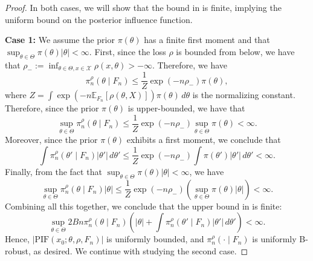 \documentclass[11pt, oneside]{amsart}
\theoremstyle{definition}   %
\newcommand{\E}{\mathbb{E}}
\newcommand{\loss}{\rho}
\newcommand{\mposterior}{\pi_n^{\loss}}
\begin{document}
\begin{proof}
    In both cases, we will show that the bound in  is finite, implying the uniform bound on the posterior influence function.
    
    \textbf{Case 1:} We assume the prior \( \pi(\theta) \) has a finite first moment and that \( \sup_{\theta \in \Theta} \pi(\theta) | \theta | < \infty \).
    First, since the loss \( \loss \) is bounded from below, we have that \( \loss_- := \inf_{\theta \in \Theta, x \in \mathcal{X}} \loss(x, \theta) > -\infty \). Therefore, we have
    \begin{equation*}
        \mposterior(\theta \mid F_n) \leq \frac{1}{Z} \exp(-n \loss_- ) \pi(\theta),
    \end{equation*}
    where \( Z = \int \exp \left ( - n \E_{F_n} [\loss (\theta, X)] \right ) \pi(\theta) \, d\theta \) is the normalizing constant. Therefore, since the prior \( \pi(\theta)\) is upper-bounded, we have that 
    \[ 
        \sup_{\theta \in \Theta} \mposterior(\theta \mid F_n) \leq \frac{1}{Z}\exp(-n \loss_- ) \sup_{\theta \in \Theta} \pi(\theta) < \infty. 
    \] 
    Moreover, since the prior \( \pi (\theta) \) exhibits a first moment, we conclude that
    \[
        \int \mposterior(\theta' \mid F_n) |\theta' | \, d\theta' \leq
        \frac{1}{Z} \exp(-n \loss_- ) \int \pi(\theta') |\theta' | \, d\theta'  < \infty.
    \]
    Finally, from the fact that \( \sup_{\theta \in \Theta} \pi(\theta) | \theta | < \infty \), we have
    \[
        \sup_{\theta \in \Theta} \mposterior(\theta \mid F_n) \left | \theta \right | \leq 
        \frac{1}{Z} \exp(-n \loss_- ) \left ( \sup_{\theta \in \Theta} \pi(\theta) | \theta | \right ) < \infty.
    \]
   Combining all this together, we conclude that the upper bound in  is finite:
    \[
    \sup_{\theta \in \Theta} 2B n \mposterior(\theta \mid F_n) \left ( | \theta | + \int \mposterior(\theta' \mid F_n) |\theta'| \, d\theta' \right ) < \infty.
    \]
    Hence, \( \left |\textrm{PIF}(x_0; \theta,\rho, F_n) \right | \) is uniformly bounded, and \( \mposterior(\cdot \mid F_n) \) is uniformly B-robust, as desired. We continue with studying the second case.


\end{proof}
\end{document}
